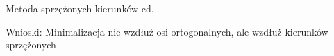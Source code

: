 \begin{frame}{Metoda sprzężonych kierunków cd.}



 	\begin{block}{Wnioski:}
			Minimalizacja nie wzdłuż osi ortogonalnych,
			ale wzdłuż kierunków sprzężonych
 	\end{block}

  \end{frame}

